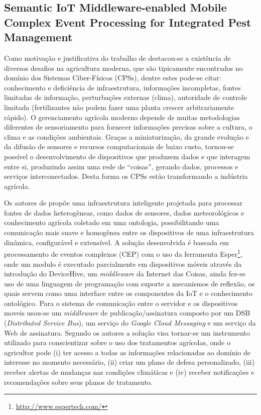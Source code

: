 \documentclass[ti,table]{texufpel} %
\begin{document}
  

\subsection{Semantic IoT Middleware-enabled Mobile Complex Event Processing for Integrated Pest Management} 

  

  

    Como motivação e justificativa do trabalho de \cite{art3nocera2017semantic} destacou-se a existência de diversos desafios na agricultura moderna, que são tipicamente encontrados no domínio dos Sistemas Ciber-Físicos (CPSs), dentre estes pode-se citar: conhecimento e deficiência de infraestrutura, informações incompletas, fontes limitadas de informação, perturbações externas (clima), autoridade de controle limitada (fertilizantes não podem fazer uma planta crescer arbitrariamente rápido). O gerenciamento agrícola moderno depende de muitas metodologias diferentes de sensoriamento para fornecer informações precisas sobre a cultura, o clima e as condições ambientais. Graças a miniaturização, da grande evolução e da difusão de sensores e recursos computacionais de baixo custo, tornou-se possível o desenvolvimento de dispositivos que produzem dados e que interagem entre si, produzindo assim uma rede de ``coisas'', gerando dados, processos e serviços interconectados. Desta forma os CPSs estão transformando a indústria agrícola. 

     

    Os autores de \cite{art3nocera2017semantic} propõe uma infraestrutura inteligente projetada para processar fontes de dados heterogêneas, como dados de sensores, dados meteorológicos e conhecimento agrícola coletado em uma ontologia, possibilitando uma comunicação mais suave e homogênea entre os dispositivos de uma infraestrutura dinâmica, configurável e extensível. A solução desenvolvida é baseada em processamento de eventos complexos (CEP) com o uso da ferramenta Esper\footnote{\url{http://www.espertech.com/}}, onde um modulo é executado parcialmente em dispositivos móveis através da introdução do DeviceHive, um \textit{middleware} da Internet das Coisas, ainda fez-se uso de uma linguagem de programação com suporte a mecanismos de reflexão, os quais servem como uma interface entre os componentes da IoT e o conhecimento ontológico. Para o sistema de comunicação entre o servidor e os dispositivos moveis usou-se um \textit{middleware} de publicação/assinatura composto por um DSB (\textit{Distributed Service Bus}), um serviço do \textit{Google Cloud Messaging} e um serviço da Web de assinatura. Segundo os autores a solução visa tornar-se um instrumento utilizado para conscientizar sobre o uso dos tratamentos agrícolas, onde o agricultor pode (i) ter acesso a todas as informações relacionadas ao domínio de interesse no momento necessário, (ii) criar um plano de defesa personalizado, (iii) receber alertas de mudanças nas condições climáticas e (iv) receber notificações e recomendações sobre seus planos de tratamento. 
\end{document}
